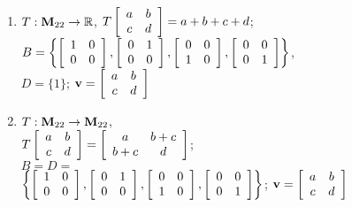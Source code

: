 \begin{multicols}{1}
\begin{ex}
\begin{enumerate}[label={\alph*.}]
\item $T : \textbf{M}_{22} \to \mathbb{R}$, $T\left[ \begin{array}{cc} a & b \\ c & d \end{array} \right] = a + b + c + d$; 
\\ \hspace*{-1em}$B = \left\{ \left[ \begin{array}{rr} 1 & 0 \\ 0 & 0 \end{array} \right], \left[ \begin{array}{rr} 0 & 1 \\ 0 & 0 \end{array} \right], \left[ \begin{array}{rr} 0 & 0 \\ 1 & 0 \end{array} \right], \left[ \begin{array}{rr} 0 & 0 \\ 0 & 1 \end{array} \right] \right\}$, \\
$D = \{1\}$; $\textbf{v} = \left[ \begin{array}{cc} a & b \\ c & d \end{array} \right]$


\item $T : \textbf{M}_{22} \to \textbf{M}_{22}$, \\ $T\left[ \begin{array}{cc} a & b \\ c & d \end{array} \right] = \left[ \begin{array}{cc} a & b + c \\ b + c & d \end{array} \right]$; \\
$B = D = {}$ \\ $\left\{ \left[ \begin{array}{rr} 1 & 0 \\ 0 & 0 \end{array} \right], \left[ \begin{array}{rr} 0 & 1 \\ 0 & 0 \end{array} \right], \left[ \begin{array}{rr} 0 & 0 \\ 1 & 0 \end{array} \right], \left[ \begin{array}{rr} 0 & 0 \\ 0 & 1 \end{array} \right] \right\}$; 
$\textbf{v} = \left[ \begin{array}{cc} a & b \\ c & d \end{array} \right]$



\end{enumerate}
\end{ex}
\end{multicols}
